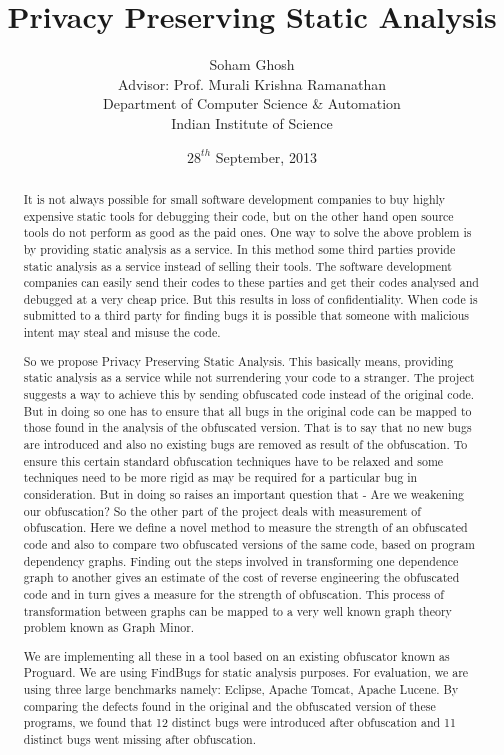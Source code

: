 \documentclass[twocolumn]{article}
\begin{document}
\title{\large \bf Privacy Preserving Static Analysis }
\author{Soham Ghosh\\Advisor: Prof. Murali Krishna Ramanathan\\Department of Computer Science \& Automation\\Indian Institute of Science} 
\date{$28^{th}$ September, 2013}
\maketitle
\thispagestyle{empty}
%
\begin{abstract}
It is not always possible for small software development companies to buy highly expensive static tools for debugging their code, but on the other hand open source tools do not perform 
as good as the paid ones. One way to solve the above problem is by providing static analysis as a service. In this method some third parties provide static analysis as a service 
instead of selling their tools. The software development companies can easily send their codes to these parties and get their codes analysed and debugged at a very cheap price. But 
this results in loss of confidentiality. When code is submitted to a third party for finding bugs it is possible that someone with malicious intent may steal and misuse the code. 

So we propose Privacy Preserving Static Analysis. This basically means, providing static analysis as a service while not surrendering your code to a stranger.  The project suggests a 
way to achieve this by sending obfuscated code instead of the original code. But in doing so one has to ensure that all bugs in the original code can be mapped to those found in the 
analysis of the obfuscated version. That is to say that no new bugs are introduced and also no existing bugs are removed as result of the obfuscation. To ensure this certain standard 
obfuscation techniques have to be relaxed and some techniques need to be more rigid as may be required for a particular bug in consideration. But in doing so raises an important 
question that - Are we weakening our obfuscation? So the other part of the project deals with measurement of obfuscation. Here we define a novel method to measure the strength of an 
obfuscated code and also to compare two obfuscated versions of the same code, based on program dependency graphs. Finding out the steps involved in transforming one dependence graph 
to another gives an estimate of the cost of reverse engineering the obfuscated code and in turn gives a measure for the strength of obfuscation. This process of transformation between 
graphs can be mapped to a very well known graph theory problem known as Graph Minor. 

We are implementing all these in a tool based on an existing obfuscator known as Proguard. We are using FindBugs for static analysis purposes. For evaluation, we are using three large 
benchmarks namely: Eclipse, Apache Tomcat, Apache Lucene. By comparing the defects found in the original and the obfuscated version of these programs, we found that 12 distinct bugs 
were introduced after obfuscation and 11 distinct bugs went missing after obfuscation.
\end{abstract}
\end{document}
